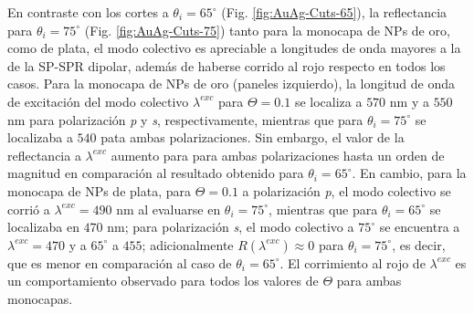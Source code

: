 En contraste con los cortes a $\theta_i=65^\circ$ (Fig. \ref{fig:AuAg-Cuts-65}), la reflectancia para $\theta_i=75^\circ$ (Fig. \ref{fig:AuAg-Cuts-75}) tanto para la monocapa de NPs de oro, como de plata, el modo colectivo es apreciable a longitudes de onda mayores a la de la SP-SPR dipolar, además de haberse corrido al rojo respecto en todos los casos. Para la monocapa de NPs de oro (paneles izquierdo), la longitud de onda de excitación del modo colectivo $\lambda^{exc}$ para $\Theta=0.1$ se localiza a $570$ nm y a $550$ nm para polarización \emph{p} y \emph{s}, respectivamente, mientras que para $\theta_i=75^\circ$ se localizaba a $540$ pata ambas polarizaciones. Sin embargo, el valor de la reflectancia a $\lambda^{exc}$ aumento para para ambas polarizaciones hasta un orden de magnitud en comparación al resultado obtenido para $\theta_i=65^\circ$. En cambio, para la monocapa de NPs de plata, para $\Theta=0.1$ a polarización \emph{p}, el modo colectivo se corrió a $\lambda^{exc}=490$ nm al evaluarse en $\theta_i=75^\circ$, mientras que para $\theta_i=65^\circ$ se localizaba en $470$ nm; para polarización \emph{s}, el modo colectivo a $75^\circ$ se encuentra a $\lambda^{exc}=470$ y a $65^\circ$ a $455$; adicionalmente $R(\lambda^{exc})\approx 0$ para $\theta_i=75^\circ$, es decir, que es menor en comparación al caso de $\theta_i=65^\circ$. El corrimiento al rojo de $\lambda^{exc}$ es un comportamiento observado para todos los valores de $\Theta$ para ambas monocapas.

